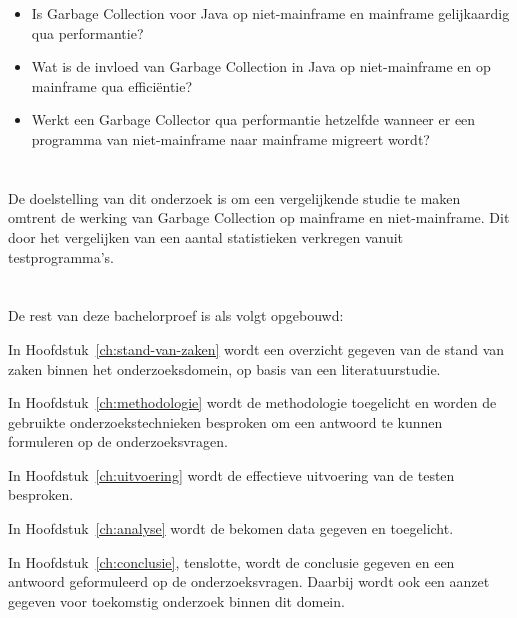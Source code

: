 \begin{itemize}
    \item Is Garbage Collection voor Java op niet-mainframe en mainframe gelijkaardig qua performantie?
    \item Wat is de invloed van Garbage Collection in Java op niet-mainframe en op mainframe qua efficiëntie?
    \item Werkt een Garbage Collector qua performantie hetzelfde wanneer er een programma van niet-mainframe naar mainframe migreert wordt?
\end{itemize}



  

\section{}%
\label{sec:onderzoeksdoelstelling}

De doelstelling van dit onderzoek is om een vergelijkende studie te maken omtrent de werking van Garbage Collection op mainframe en niet-mainframe.
Dit door het vergelijken van een aantal statistieken verkregen vanuit testprogramma's.



\section{}%
\label{sec:opzet-bachelorproef}


De rest van deze bachelorproef is als volgt opgebouwd:

In Hoofdstuk~\ref{ch:stand-van-zaken} wordt een overzicht gegeven van de stand van zaken binnen het onderzoeksdomein, op basis van een literatuurstudie.

In Hoofdstuk~\ref{ch:methodologie} wordt de methodologie toegelicht en worden de gebruikte onderzoekstechnieken besproken om een antwoord te kunnen formuleren op de onderzoeksvragen.


In Hoofdstuk~\ref{ch:uitvoering} wordt de effectieve uitvoering van de testen besproken.

In Hoofdstuk~\ref{ch:analyse} wordt de bekomen data gegeven en toegelicht.

In Hoofdstuk~\ref{ch:conclusie}, tenslotte, wordt de conclusie gegeven en een antwoord geformuleerd op de onderzoeksvragen. Daarbij wordt ook een aanzet gegeven voor toekomstig onderzoek binnen dit domein.